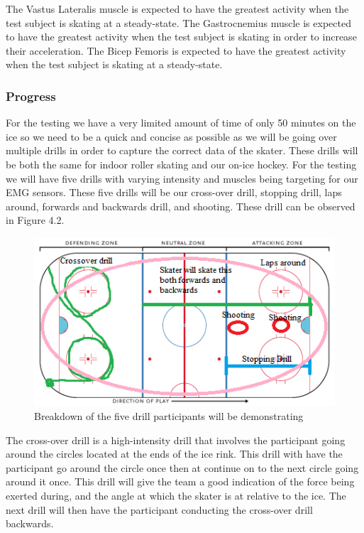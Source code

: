 The Vastus Lateralis muscle is expected to have the greatest activity when the test subject is skating at a steady-state. The Gastrocnemius muscle is expected to have the greatest activity when the test subject is skating in order to increase their acceleration. The Bicep Femoris is expected to have the greatest activity when the test subject is skating at a steady-state.

\subsubsection{Progress}
For the testing we have a very limited amount of time of only 50 minutes on the ice so we need to be a quick and concise as possible as we will be going over multiple drills in order to capture the correct data of the skater. These drills will be both the same for indoor roller skating and our on-ice hockey. For the testing we will have five drills with varying intensity and muscles being targeting for our EMG sensors. These five drills will be our cross-over drill, stopping drill, laps around, forwards and backwards drill, and shooting. These drill can be observed in Figure 4.2.
\par
\begin{figure}[H]
\centering
\includegraphics{Progress_Report/figs/HockeyRink-Zones.png}
\caption{Breakdown of the five drill participants will be demonstrating\cite{4}}
\label{fig:HockeyRink}
\end{figure}
\par
The cross-over drill is a high-intensity drill that involves the participant going around the circles located at the ends of the ice rink. This drill with have the participant go around the circle once then at continue on to the next circle going around it once. This drill will give the team a good indication of the force being exerted during, and the angle at which the skater is at relative to the ice. The next drill will then have the participant conducting the cross-over drill backwards. 


